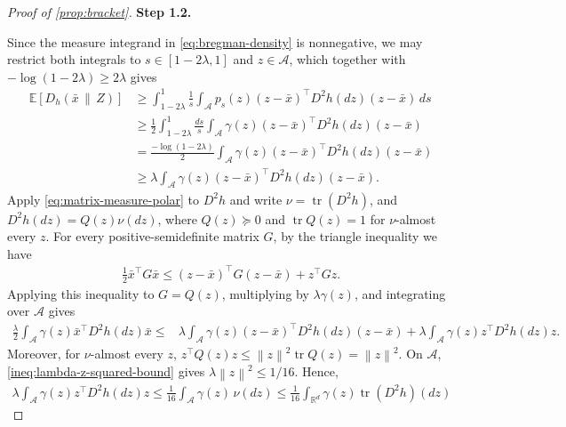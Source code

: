 \documentclass{article}
\newcommand{\proofstepinline}[1]{%
    {\normalfont\normalsize\bfseries\color{blue!55!black}Step #1.}\enspace
}
\newcommand{\R}{\mathbb R}
\newcommand{\E}{\mathbb E}
\newcommand{\tr}{\operatorname{tr}}
\newcommand{\1}{\mathbf 1}
\newcommand{\norm}[1]{\left\lVert #1\right\rVert}
\begin{document}
\begin{proof}[Proof of \cref{prop:bracket}]
    \proofstepinline{1.2}
    Since the measure integrand in \eqref{eq:bregman-density} is
    nonnegative, we may restrict both integrals to
    $s\in[1-2\lambda,1]$ and $z\in\mathcal A$,
    which together with $-\log(1-2\lambda)\geq2\lambda$ gives
    \begin{align}
        \E[D_h(\bar{x}\,\|\,Z)]
         & \geq
        \int_{1-2\lambda}^1\frac1s
        \int_{\mathcal A}
        p_s(z)(z-\bar{x})^\top D^2h(dz)(z-\bar{x})\,ds
        \\
         & \geq
        \frac12
        \int_{1-2\lambda}^1\frac{ds}{s}
        \int_{\mathcal A}
        \gamma(z)(z-\bar{x})^\top D^2h(dz)(z-\bar{x})
        \\
         & =
        \frac{-\log(1-2\lambda)}{2}
        \int_{\mathcal A}
        \gamma(z)(z-\bar{x})^\top D^2h(dz)(z-\bar{x})
        \\
         & \geq
        \lambda
        \int_{\mathcal A}
        \gamma(z)(z-\bar{x})^\top D^2h(dz)(z-\bar{x}).
        \label{eq:bregman-lower}
    \end{align}
    Apply \eqref{eq:matrix-measure-polar} to $D^2h$ and write
    $\nu=\tr(D^2h)$, and $D^2h(dz)=Q(z)\nu(dz)$,
    where $Q(z)\succeq0$ and $\tr Q(z)=1$ for $\nu$-almost every $z$.
    For every positive-semidefinite matrix $G$, by the triangle inequality we have
    \begin{align}
        \frac12\bar{x}^\top G\bar{x}
        \leq
        (z-\bar{x})^\top G(z-\bar{x})+z^\top Gz.
    \end{align}
    Applying this inequality to $G=Q(z)$, multiplying by
    $\lambda\gamma(z)$, and integrating over $\mathcal A$ gives
    \begin{align}
        \frac\lambda2
        \int_{\mathcal A}
        \gamma(z)\bar{x}^\top D^2h(dz)\bar{x}
        \leq{} &
        \lambda
        \int_{\mathcal A}
        \gamma(z)(z-\bar{x})^\top D^2h(dz)(z-\bar{x})
        +
        \lambda
        \int_{\mathcal A}
        \gamma(z)z^\top D^2h(dz)z.
    \end{align}
    Moreover, for $\nu$-almost every $z$,
    $z^\top Q(z)z
        \leq
        \norm{z}^2\tr Q(z)
        =
        \norm{z}^2.$
    On $\mathcal A$, \eqref{ineq:lambda-z-squared-bound} gives $\lambda\norm{z}^2\leq1/16$.
    Hence,
    \begin{align}
        \lambda
        \int_{\mathcal A}
        \gamma(z)z^\top D^2h(dz)z
        \leq
        \frac1{16}
        \int_{\mathcal A}\gamma(z)\,\nu(dz)
        \leq
        \frac1{16}
        \int_{\R^d}\gamma(z)\tr(D^2h)(dz)

\end{align}
\end{proof}
\end{document}
